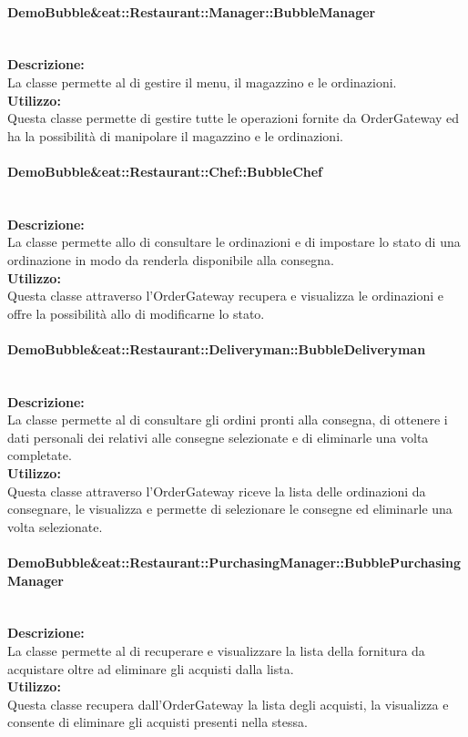 \paragraph{Demo\-Bubble\&eat\-::Restaurant\-::Manager\-::Bubble\-Manager}\label{eat-manager}\mbox{}\\
\textbf{Descrizione:}\\
La classe permette al \Manager{} di gestire il menu, il magazzino e le ordinazioni.\\
\textbf{Utilizzo:}\\
Questa classe permette di gestire tutte le operazioni fornite da Order\-Gateway ed ha la possibilità di manipolare il magazzino e le ordinazioni.\\

\paragraph{Demo\-Bubble\&eat\-::Restaurant\-::Chef\-::Bubble\-Chef}\label{eat-chef}\mbox{}\\
\textbf{Descrizione:}\\
La classe permette allo \Chef{} di consultare le ordinazioni e di impostare lo stato di una ordinazione in modo da renderla disponibile alla consegna.\\
\textbf{Utilizzo:}\\
Questa classe attraverso l'Order\-Gateway recupera e visualizza le ordinazioni e offre la possibilità allo \Chef{} di modificarne lo stato.\\

\paragraph{Demo\-Bubble\&eat\-::Restaurant\-::Deliveryman\-::Bubble\-Deliveryman}\label{eat-deliveryman}\mbox{}\\
\textbf{Descrizione:}\\
La classe permette al \Deliveryman{} di consultare gli ordini pronti alla consegna, di ottenere i dati personali dei \Customer[2]{} relativi alle consegne selezionate e di eliminarle una volta completate.\\
\textbf{Utilizzo:}\\
Questa classe attraverso l'Order\-Gateway riceve la lista delle ordinazioni da consegnare, le visualizza e permette di selezionare le consegne ed eliminarle una volta selezionate.

\paragraph{Demo\-Bubble\&eat\-::Restaurant\-::PurchasingManager\-::Bubble\-Purcha\-sing\-Ma\-nager}\label{eat-purchasing}\mbox{}\\
\textbf{Descrizione:}\\
La classe permette al \Purchasingmanager{} di recuperare e visualizzare la lista della fornitura da acquistare oltre ad eliminare gli acquisti dalla lista.\\
\textbf{Utilizzo:}\\
Questa classe recupera dall'Order\-Gateway la lista degli acquisti, la visualizza e consente di eliminare gli acquisti presenti nella stessa.

